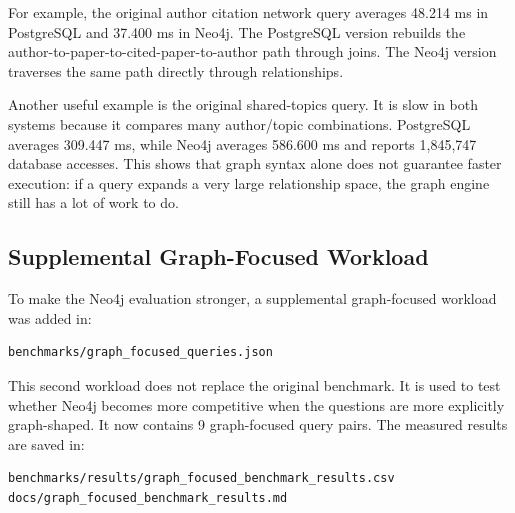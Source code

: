 \documentclass[11pt]{article}
\begin{document}
For example, the original author citation network query averages 48.214 ms in PostgreSQL and 37.400 ms in Neo4j.
The PostgreSQL version rebuilds the author-to-paper-to-cited-paper-to-author path through joins.
The Neo4j version traverses the same path directly through relationships.

Another useful example is the original shared-topics query.
It is slow in both systems because it compares many author/topic combinations.
PostgreSQL averages 309.447 ms, while Neo4j averages 586.600 ms and reports 1,845,747 database accesses.
This shows that graph syntax alone does not guarantee faster execution: if a query expands a very large relationship space, the graph engine still has a lot of work to do.

\subsection{Supplemental Graph-Focused Workload}

To make the Neo4j evaluation stronger, a supplemental graph-focused workload was added in:

\begin{verbatim}
benchmarks/graph_focused_queries.json
\end{verbatim}

This second workload does not replace the original benchmark.
It is used to test whether Neo4j becomes more competitive when the questions are more explicitly graph-shaped.
It now contains 9 graph-focused query pairs.
The measured results are saved in:

\begin{verbatim}
benchmarks/results/graph_focused_benchmark_results.csv
docs/graph_focused_benchmark_results.md
\end{verbatim}
\end{document}
